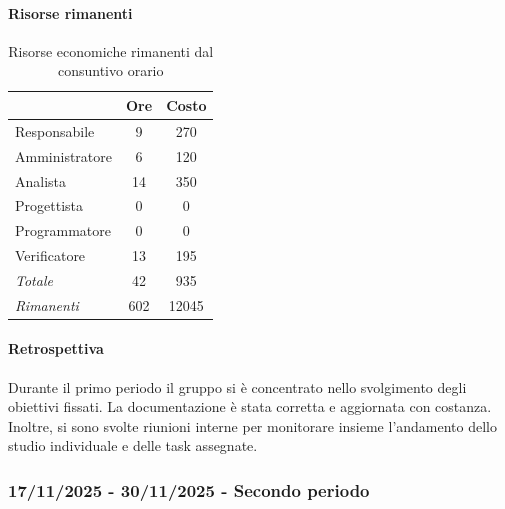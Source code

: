 \documentclass[a4paper,12pt]{article}
\begin{document}
            \paragraph{Risorse rimanenti}
                \begin{table}[H]
                \centering
                \caption{Risorse economiche rimanenti dal consuntivo orario}
                \begin{tabular}{|l|c|c|}
                \hline
                    \rowcolor{lightgray}{\textbf{Ruolo}} & {\textbf{Ore}} & {\textbf{Costo}}\\
                \hline
                    Responsabile & 9 & 270\\
                \hline
                    Amministratore & 6 & 120\\
                \hline
                    Analista & 14 & 350\\
                \hline
                    Progettista & 0 & 0\\
                \hline
                    Programmatore & 0 & 0\\
                \hline
                    Verificatore & 13 & 195\\
                \hline
                    \rowcolor{lightgray}\textit{Totale} & 42 & 935\\
                \hline
                    \rowcolor{lightgray}\textit{Rimanenti} & 602 & 12045\\
                \hline
                \end{tabular}
                \end{table}
                
            \paragraph{Retrospettiva}
            Durante il primo periodo il gruppo si è concentrato nello svolgimento degli obiettivi fissati. La documentazione è stata corretta e aggiornata con costanza. Inoltre, si sono svolte riunioni interne per monitorare insieme l'andamento dello studio individuale e delle task assegnate.

        \subsubsection{17/11/2025 - 30/11/2025 - Secondo periodo}
\end{document}
